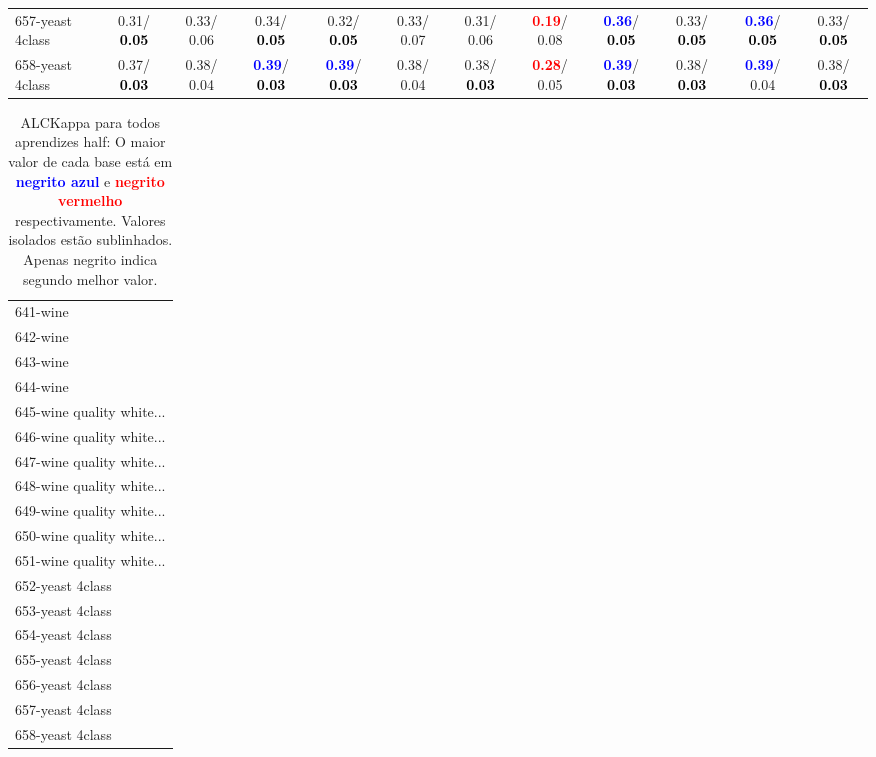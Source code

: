 \begin{table}[h]
\begin{center}
{\begin{tabular}{lc|c|c|c|c|c|c|c|c|c|c}
657-yeast 4class &   0.31/\textcolor{black}{\textbf{  0.05}} &   0.33/  0.06 &   0.34/\textcolor{black}{\textbf{  0.05}} &   0.32/\textcolor{black}{\textbf{  0.05}} &   0.33/  0.07 &   0.31/  0.06 & \textcolor{red}{\textbf{  0.19}}/  0.08 & \textcolor{blue}{\textbf{  0.36}}/\textcolor{black}{\textbf{  0.05}} &   0.33/\textcolor{black}{\textbf{  0.05}} & \textcolor{blue}{\textbf{  0.36}}/\textcolor{black}{\textbf{  0.05}} &   0.33/\textcolor{black}{\textbf{  0.05}} \\
658-yeast 4class &   0.37/\textcolor{black}{\textbf{  0.03}} &   0.38/  0.04 & \textcolor{blue}{\textbf{  0.39}}/\textcolor{black}{\textbf{  0.03}} & \textcolor{blue}{\textbf{  0.39}}/\textcolor{black}{\textbf{  0.03}} &   0.38/  0.04 &   0.38/\textcolor{black}{\textbf{  0.03}} & \textcolor{red}{\textbf{  0.28}}/  0.05 & \textcolor{blue}{\textbf{  0.39}}/\textcolor{black}{\textbf{  0.03}} &   0.38/\textcolor{black}{\textbf{  0.03}} & \textcolor{blue}{\textbf{  0.39}}/  0.04 &   0.38/\textcolor{black}{\textbf{  0.03}} \\\end{tabular}}\label{stratsALCKappa20AllReduxa}
\end{center}
\end{table}
\begin{table}[h]
\caption{ALCKappa para todos aprendizes half: O maior valor de cada base está em \textcolor{blue}{\textbf{negrito azul}} e \textcolor{red}{\textbf{negrito vermelho}} respectivamente. Valores isolados estão sublinhados. Apenas negrito indica segundo melhor valor.}
\begin{center}\begin{tabular}{l}
 & \\ \hline 641-wine &  \\
642-wine &  \\
643-wine &  \\
644-wine &  \\
645-wine quality white... &  \\
646-wine quality white... &  \\
647-wine quality white... &  \\ \hline
648-wine quality white... &  \\
649-wine quality white... &  \\
650-wine quality white... &  \\
651-wine quality white... &  \\
652-yeast 4class &  \\
653-yeast 4class &  \\
654-yeast 4class &  \\ \hline
655-yeast 4class &  \\
656-yeast 4class &  \\
657-yeast 4class &  \\
658-yeast 4class &  \\\end{tabular}\label{stratsALCKappa20AllReduxb}
\end{center}
\end{table}
